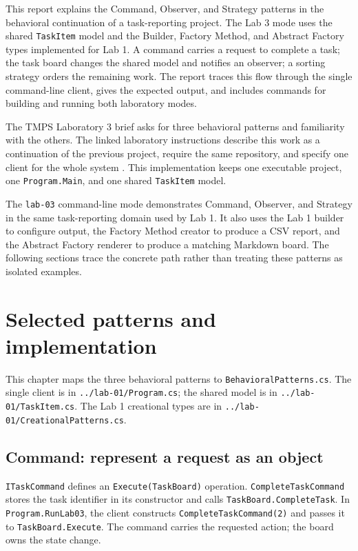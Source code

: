 \documentclass{utmreport}
\begin{document}
\makeutmreporttitlepage
\tableofcontents

\begin{utmabstract}[Abstract]
This report explains the Command, Observer, and Strategy patterns in the behavioral continuation of a task-reporting project. The Lab 3 mode uses the shared \texttt{TaskItem} model and the Builder, Factory Method, and Abstract Factory types implemented for Lab 1. A command carries a request to complete a task; the task board changes the shared model and notifies an observer; a sorting strategy orders the remaining work. The report traces this flow through the single command-line client, gives the expected output, and includes commands for building and running both laboratory modes.

\end{utmabstract}

\utmintroduction
The TMPS Laboratory 3 brief asks for three behavioral patterns and familiarity with the others. The linked laboratory instructions describe this work as a continuation of the previous project, require the same repository, and specify one client for the whole system \cite{brief,repo}. This implementation keeps one executable project, one \texttt{Program.Main}, and one shared \texttt{TaskItem} model.

The \texttt{lab-03} command-line mode demonstrates Command, Observer, and Strategy in the same task-reporting domain used by Lab 1. It also uses the Lab 1 builder to configure output, the Factory Method creator to produce a CSV report, and the Abstract Factory renderer to produce a matching Markdown board. The following sections trace the concrete path rather than treating these patterns as isolated examples.

\chapter{Selected patterns and implementation}
This chapter maps the three behavioral patterns to \texttt{BehavioralPatterns.cs}. The single client is in \texttt{../lab-01/Program.cs}; the shared model is in \texttt{../lab-01/TaskItem.cs}. The Lab 1 creational types are in \texttt{../lab-01/CreationalPatterns.cs}.

\section{Command: represent a request as an object}
\texttt{ITaskCommand} defines an \texttt{Execute(TaskBoard)} operation. \texttt{CompleteTaskCommand} stores the task identifier in its constructor and calls \texttt{TaskBoard.CompleteTask}. In \texttt{Program.RunLab03}, the client constructs \texttt{CompleteTaskCommand(2)} and passes it to \texttt{TaskBoard.Execute}. The command carries the requested action; the board owns the state change.
\end{document}
